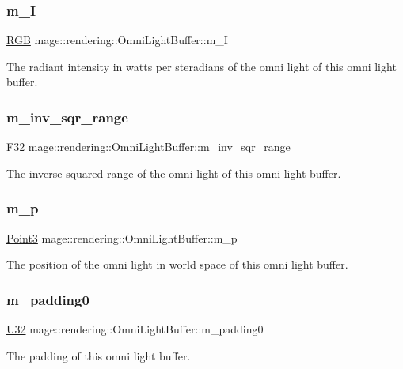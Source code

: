 \subsubsection{\texorpdfstring{m\+\_\+I}{m\_I}}
{\footnotesize\ttfamily \hyperlink{structmage_1_1_r_g_b}{R\+GB} mage\+::rendering\+::\+Omni\+Light\+Buffer\+::m\+\_\+I}

The radiant intensity in watts per steradians of the omni light of this omni light buffer. \hypertarget{structmage_1_1rendering_1_1_omni_light_buffer_ac6a0b6050b8d705d46f72ed115b28c4a}{}\label{structmage_1_1rendering_1_1_omni_light_buffer_ac6a0b6050b8d705d46f72ed115b28c4a} 
\subsubsection{\texorpdfstring{m\+\_\+inv\+\_\+sqr\+\_\+range}{m\_inv\_sqr\_range}}
{\footnotesize\ttfamily \hyperlink{namespacemage_aa97e833b45f06d60a0a9c4fc22ae02c0}{F32} mage\+::rendering\+::\+Omni\+Light\+Buffer\+::m\+\_\+inv\+\_\+sqr\+\_\+range}

The inverse squared range of the omni light of this omni light buffer. \hypertarget{structmage_1_1rendering_1_1_omni_light_buffer_aab9cd7c4702a9cba7b47ec49983658d7}{}\label{structmage_1_1rendering_1_1_omni_light_buffer_aab9cd7c4702a9cba7b47ec49983658d7} 
\subsubsection{\texorpdfstring{m\+\_\+p}{m\_p}}
{\footnotesize\ttfamily \hyperlink{structmage_1_1_point3}{Point3} mage\+::rendering\+::\+Omni\+Light\+Buffer\+::m\+\_\+p}

The position of the omni light in world space of this omni light buffer. \hypertarget{structmage_1_1rendering_1_1_omni_light_buffer_a3b440492e1a9fc48c6f109e5787aa4c7}{}\label{structmage_1_1rendering_1_1_omni_light_buffer_a3b440492e1a9fc48c6f109e5787aa4c7} 
\subsubsection{\texorpdfstring{m\+\_\+padding0}{m\_padding0}}
{\footnotesize\ttfamily \hyperlink{namespacemage_a41c104c036fba3756a74e19f793eeaa1}{U32} mage\+::rendering\+::\+Omni\+Light\+Buffer\+::m\+\_\+padding0}

The padding of this omni light buffer. 